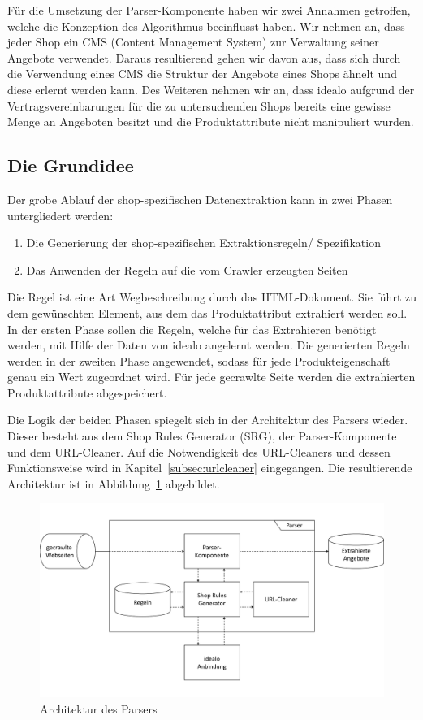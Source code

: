 Für die Umsetzung der Parser-Komponente haben wir zwei Annahmen getroffen, welche die Konzeption des Algorithmus
beeinflusst haben.
Wir nehmen an, dass jeder Shop ein CMS (Content Management System) zur Verwaltung seiner Angebote verwendet.
Daraus resultierend gehen wir davon aus, dass sich durch die Verwendung eines CMS die Struktur der Angebote eines Shops
ähnelt und diese erlernt werden kann.
Des Weiteren nehmen wir an, dass idealo aufgrund der Vertragsvereinbarungen für die zu untersuchenden Shops bereits
eine gewisse Menge an Angeboten besitzt und die Produktattribute nicht manipuliert wurden.

\subsection{Die Grundidee}
\label{subsec:grundidee}

Der grobe Ablauf der shop-spezifischen Datenextraktion kann in zwei Phasen untergliedert werden:
\begin{enumerate}
    \item Die Generierung der shop-spezifischen Extraktionsregeln/ Spezifikation
    \item Das Anwenden der Regeln auf die vom Crawler erzeugten Seiten
\end{enumerate}
Die Regel ist eine Art Wegbeschreibung durch das HTML-Dokument.
Sie führt zu dem gewünschten Element, aus dem das Produktattribut extrahiert werden soll.
In der ersten Phase sollen die Regeln, welche für das Extrahieren benötigt werden, mit Hilfe der Daten von idealo
angelernt werden.
Die generierten Regeln werden in der zweiten Phase angewendet, sodass für jede Produkteigenschaft genau ein Wert
zugeordnet wird.
Für jede gecrawlte Seite werden die extrahierten Produktattribute abgespeichert.

Die Logik der beiden Phasen spiegelt sich in der Architektur des Parsers wieder.
Dieser besteht aus dem Shop Rules Generator (SRG), der Parser-Komponente und dem URL-Cleaner.
Auf die Notwendigkeit des URL-Cleaners und dessen Funktionsweise wird in Kapitel~\ref{subsec:urlcleaner} eingegangen.
Die resultierende Architektur ist in Abbildung~\ref{fig:architektur-parser} abgebildet.

\begin{figure}[H]
    \centering
    \includegraphics[width=\textwidth, trim=0 1.7cm 0 1.7cm, clip]{resources/Architektur-Parser.pdf}
    \caption{Architektur des Parsers}
    \label{fig:architektur-parser}
\end{figure}

